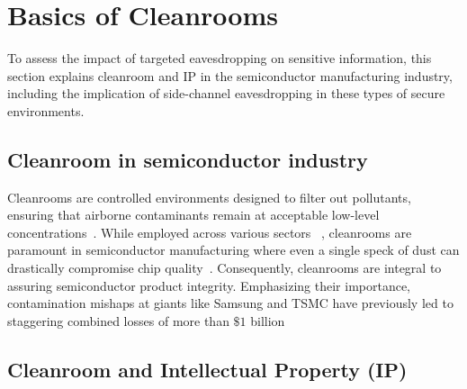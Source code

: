 \appendices
\section{Basics of Cleanrooms}
\label{appendix:cleanroombasics}
To assess the impact of targeted eavesdropping on sensitive information, this section explains cleanroom and IP in the semiconductor manufacturing industry,  including the implication of side-channel eavesdropping in these types of secure environments. 

\subsection{Cleanroom in semiconductor industry}
\label{subsec:Cleanroom}
Cleanrooms are controlled environments designed to filter out pollutants, ensuring that airborne contaminants remain at acceptable low-level concentrations~\cite{cobo2008airborne, standard2004cleanrooms}. 
While employed across various sectors ~\cite{holbrook2009controlling}, cleanrooms are paramount in semiconductor manufacturing where even a single speck of dust can drastically compromise chip quality~\cite{cooper1986particulate,
kitajima1997requirements}.
Consequently, cleanrooms are integral to assuring semiconductor product integrity.
Emphasizing their importance, contamination mishaps at giants like Samsung and TSMC have previously led to staggering combined losses of more than $\$1$ billion~\cite{shilov_2019, yap_2018}

\subsection{Cleanroom and Intellectual Property (IP)}
\label{subsec:CleanroomSecurity and IPs}

